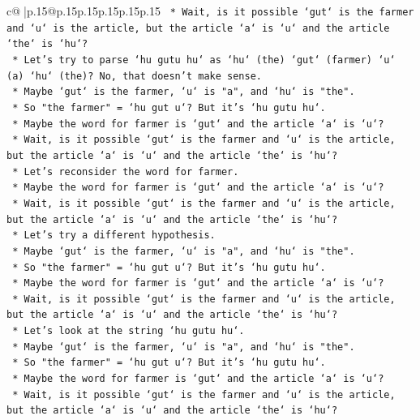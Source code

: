 \documentclass{article}
\begin{document}
{\begin{supertabular}{c@{$\;$}|p{.15\linewidth}@{}p{.15\linewidth}p{.15\linewidth}p{.15\linewidth}p{.15\linewidth}p{.15\linewidth}}
{{{\texttt{                *   Wait, is it possible `gut` is the farmer and `u` is the article, but the article `a` is `u` and the article `the` is `hu`?} \\
\texttt{                *   Let's try to parse `hu gutu hu` as `hu` (the) `gut` (farmer) `u` (a) `hu` (the)? No, that doesn't make sense.} \\
\texttt{                *   Maybe `gut` is the farmer, `u` is "a", and `hu` is "the".} \\
\texttt{                *   So "the farmer" = `hu gut u`? But it's `hu gutu hu`.} \\
\texttt{                *   Maybe the word for farmer is `gut` and the article `a` is `u`?} \\
\texttt{                *   Wait, is it possible `gut` is the farmer and `u` is the article, but the article `a` is `u` and the article `the` is `hu`?} \\
\texttt{                *   Let's reconsider the word for farmer.} \\
\texttt{                *   Maybe the word for farmer is `gut` and the article `a` is `u`?} \\
\texttt{                *   Wait, is it possible `gut` is the farmer and `u` is the article, but the article `a` is `u` and the article `the` is `hu`?} \\
\texttt{                *   Let's try a different hypothesis.} \\
\texttt{                *   Maybe `gut` is the farmer, `u` is "a", and `hu` is "the".} \\
\texttt{                *   So "the farmer" = `hu gut u`? But it's `hu gutu hu`.} \\
\texttt{                *   Maybe the word for farmer is `gut` and the article `a` is `u`?} \\
\texttt{                *   Wait, is it possible `gut` is the farmer and `u` is the article, but the article `a` is `u` and the article `the` is `hu`?} \\
\texttt{                *   Let's look at the string `hu gutu hu`.} \\
\texttt{                *   Maybe `gut` is the farmer, `u` is "a", and `hu` is "the".} \\
\texttt{                *   So "the farmer" = `hu gut u`? But it's `hu gutu hu`.} \\
\texttt{                *   Maybe the word for farmer is `gut` and the article `a` is `u`?} \\
\texttt{                *   Wait, is it possible `gut` is the farmer and `u` is the article, but the article `a` is `u` and the article `the` is `hu`?} \\
}}}
\end{supertabular}}
\end{document}
